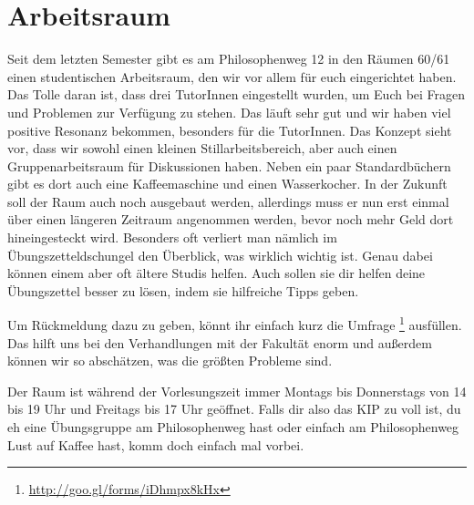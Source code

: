 \section{Arbeitsraum}
Seit dem letzten Semester gibt es am Philosophenweg 12 in den Räumen 60/61
einen studentischen Arbeitsraum, den wir vor allem für euch eingerichtet haben.
Das Tolle daran ist, dass drei TutorInnen eingestellt wurden, um Euch bei
Fragen und Problemen zur Verfügung zu stehen. Das läuft sehr gut und wir haben
viel positive Resonanz bekommen, besonders für die TutorInnen. Das Konzept
sieht vor, dass wir sowohl einen kleinen Stillarbeitsbereich, aber auch einen
Gruppenarbeitsraum für Diskussionen haben. Neben ein paar Standardbüchern gibt
es dort auch eine Kaffeemaschine und einen Wasserkocher. In der Zukunft soll
der Raum auch noch ausgebaut werden, allerdings muss er nun erst einmal über
einen längeren Zeitraum angenommen werden, bevor noch mehr Geld dort
hineingesteckt wird. Besonders oft verliert man nämlich im
Übungszetteldschungel den Überblick, was wirklich wichtig ist. Genau dabei
können einem aber oft ältere Studis helfen. Auch sollen sie dir helfen deine
Übungszettel besser zu lösen, indem sie hilfreiche Tipps geben.

Um Rückmeldung dazu zu geben, könnt ihr einfach kurz die Umfrage
\footnote{\url{http://goo.gl/forms/iDhmpx8kHx}} ausfüllen. Das hilft uns bei
den Verhandlungen mit der Fakultät enorm und außerdem können wir so abschätzen,
was die größten Probleme sind.

Der Raum ist während der Vorlesungszeit immer Montags bis Donnerstags von 14
bis 19 Uhr und Freitags bis 17 Uhr geöffnet. Falls dir also das KIP zu voll
ist, du eh eine Übungsgruppe am Philosophenweg hast oder einfach am
Philosophenweg Lust auf Kaffee hast, komm doch einfach mal vorbei.
